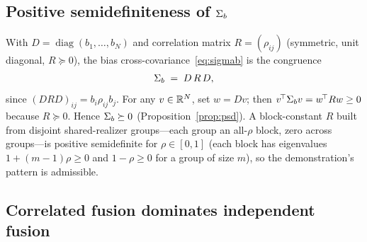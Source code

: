 \subsection{Positive semidefiniteness of $\Sigma_{b}{}$}
\label{app:psd}

With $D=\operatorname{diag}(b_1,\dots,b_N)$ and correlation matrix
$R=(\rho_{ij})$ (symmetric, unit diagonal, $R\succeq0$), the bias
cross-covariance~\eqref{eq:sigmab} is the congruence
\begin{equation}
  \Sigma_{b}{} \;=\; D\,R\,D,
  \label{eq:congruence}
\end{equation}
since $(DRD)_{ij}=b_i\rho_{ij}b_j$. For any $v\in\mathbb{R}^N$, set $w=Dv$; then
$v^{\!\top}\Sigma_{b}{}v=w^{\!\top}Rw\ge0$ because $R\succeq0$. Hence
$\Sigma_{b}{}\succeq0$ (Proposition~\ref{prop:psd}). A block-constant $R$ built from
disjoint shared-realizer groups---each group an all-$\rho$ block, zero across
groups---is positive semidefinite for $\rho\in[0,1]$ (each block has eigenvalues
$1+(m-1)\rho\ge0$ and $1-\rho\ge0$ for a group of size $m$), so the demonstration's
pattern is admissible.

\subsection{Correlated fusion dominates independent fusion}
\label{app:corr}

